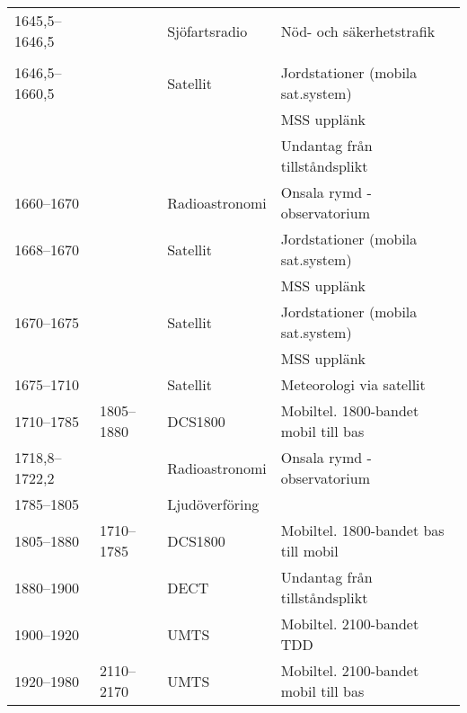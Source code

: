 \begin{landscape}
\begin{longtable}{llll}
	1645,5--1646,5     &                    & Sjöfartsradio           & Nöd- och säkerhetstrafik                 \\
	                   &                    &                         &  \\
	1646,5--1660,5     &                    & Satellit                & Jordstationer (mobila sat.system)        \\
	                   &                    &                         & MSS upplänk                              \\
	                   &                    &                         & Undantag från tillståndsplikt            \\
	1660--1670         &                    & Radioastronomi          & Onsala rymd - observatorium              \\
	1668--1670         &                    & Satellit                & Jordstationer (mobila sat.system)        \\
	                   &                    &                         & MSS upplänk                              \\
	1670--1675         &                    & Satellit                & Jordstationer (mobila sat.system)        \\
	                   &                    &                         & MSS upplänk                              \\
	1675--1710         &                    & Satellit                & Meteorologi via satellit                 \\
	1710--1785         & 1805--1880         & DCS1800                 & Mobiltel. 1800-bandet mobil till bas     \\
	1718,8--1722,2     &                    & Radioastronomi          & Onsala rymd - observatorium              \\
	1785--1805         &                    & Ljudöverföring          &  \\
	1805--1880         & 1710--1785         & DCS1800                 & Mobiltel. 1800-bandet bas till mobil     \\
	1880--1900         &                    & DECT                    & Undantag från tillståndsplikt            \\
	1900--1920         &                    & UMTS                    & Mobiltel. 2100-bandet TDD                \\
	1920--1980         & 2110--2170         & UMTS                    & Mobiltel. 2100-bandet mobil till bas     \\

\end{longtable}
\end{landscape}
